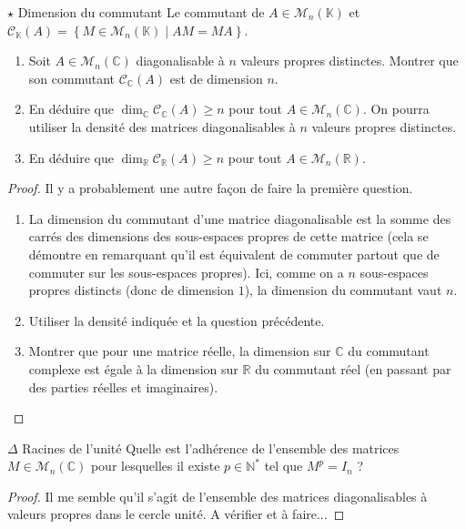 \documentclass[french,a4paper]{article}
\newcommand{\N}{\mathbb{N}}
\newcommand{\R}{\mathbb{R}}
\newcommand{\C}{\mathbb{C}}
\newcommand{\K}{\mathbb{K}}
\newcommand{\st}{^*}
\theoremstyle{plain}
\theoremstyle{definition}
\theoremstyle{remark}
\begin{document}
\begin{ex}{$\star$ Dimension du commutant}
	Le commutant de $A\in\mathcal{M}_n(\K)$ et $\mathcal{C}_\K(A)=\left\{M\in\mathcal{M}_n(\K)\mid AM=MA\right\}$.
	\begin{enumerate}
		\item Soit $A\in\mathcal{M}_n(\C)$ diagonalisable à $n$ valeurs propres distinctes. Montrer que son commutant $\mathcal{C}_\C(A)$ est de dimension $n$.
		\item En déduire que $\dim_\C\mathcal{C}_\C(A)\geqslant n$ pour tout $A\in\mathcal{M}_n(\C)$. On pourra utiliser la densité des matrices diagonalisables à $n$ valeurs propres distinctes.
		\item En déduire que $\dim_\R\mathcal{C}_\R(A)\geqslant n$ pour tout $A\in\mathcal{M}_n(\R)$.
	\end{enumerate}
\end{ex}
\begin{proof}
	Il y a probablement une autre façon de faire la première question.
	\begin{enumerate}
		\item La dimension du commutant d'une matrice diagonalisable est la somme des carrés des dimensions des sous-espaces propres de cette matrice (cela se démontre en remarquant qu'il est équivalent de commuter partout que de commuter sur les sous-espaces propres). Ici, comme on a $n$ sous-espaces propres distincts (donc de dimension $1$), la dimension du commutant vaut $n$.
		\item Utiliser la densité indiquée et la question précédente.
		\item Montrer que pour une matrice réelle, la dimension sur $\C$ du commutant complexe est égale à la dimension sur $\R$ du commutant réel (en passant par des parties réelles et imaginaires).
	\end{enumerate}
\end{proof}

\begin{ex}{$\Delta$ Racines de l'unité}
	Quelle est l'adhérence de l'ensemble des matrices $M\in\mathcal{M}_n(\C)$ pour lesquelles il existe $p\in\N\st$ tel que $M^p=I_n$ ?
\end{ex}
\begin{proof}
	Il me semble qu'il s'agit de l'ensemble des matrices diagonalisables à valeurs propres dans le cercle unité. A vérifier et à faire...
\end{proof}
\end{document}
